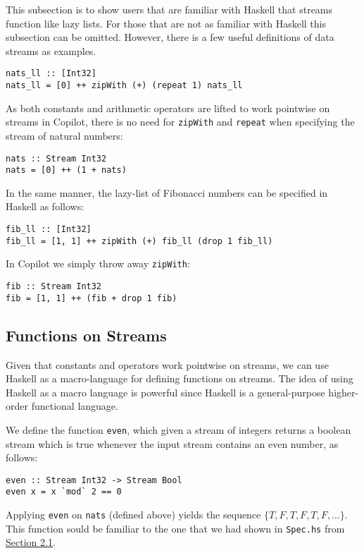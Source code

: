 This subsection is to show users that are familiar with Haskell that streams
function like lazy lists.
%
For those that are not as familiar with Haskell this
subsection can be omitted.
%
However, there is a few useful definitions of data
streams as examples.
%
\begin{lstlisting}[language = Copilot, frame = single]
nats_ll :: [Int32]
nats_ll = [0] ++ zipWith (+) (repeat 1) nats_ll
\end{lstlisting}
%
As both constants and arithmetic operators are lifted to work pointwise on
streams in Copilot, there is no need for {\tt zipWith} and {\tt repeat} when
specifying the stream of natural numbers:
%
\begin{lstlisting}[language = Copilot, frame = single]
nats :: Stream Int32
nats = [0] ++ (1 + nats)
\end{lstlisting}
%
In the same manner, the lazy-list of Fibonacci numbers can be specified  in Haskell as follows:
%
\begin{lstlisting}[language = Copilot, frame = single]
fib_ll :: [Int32]
fib_ll = [1, 1] ++ zipWith (+) fib_ll (drop 1 fib_ll)
\end{lstlisting}
%
In Copilot we simply throw away {\tt zipWith}:
\begin{lstlisting}[language = Copilot, frame = single]
fib :: Stream Int32
fib = [1, 1] ++ (fib + drop 1 fib)
\end{lstlisting}

\subsection{Functions on Streams} \label{sec:FnOnStreams}

Given that constants and operators work pointwise on streams, we can use
Haskell as a macro-language for defining functions on streams.
%
The idea of using Haskell as a macro language is powerful since Haskell is a
general-purpose higher-order functional language.

\begin{example}
We define the function {\tt even}, which given a stream of integers returns a
boolean stream which is true whenever the input stream contains an even number,
as follows:
%
\begin{lstlisting}[language = Copilot, frame = single]
even :: Stream Int32 -> Stream Bool
even x = x `mod` 2 == 0
\end{lstlisting}
%
Applying {\tt even} on {\tt nats} (defined above) yields the sequence
$\{T, F, T, F, T, F, \dots\}$.
%
This function sould be familiar to the one that
we had shown in {\tt Spec.hs} from \hyperref[interpcompile]{Section 2.1}.
\end{example}

